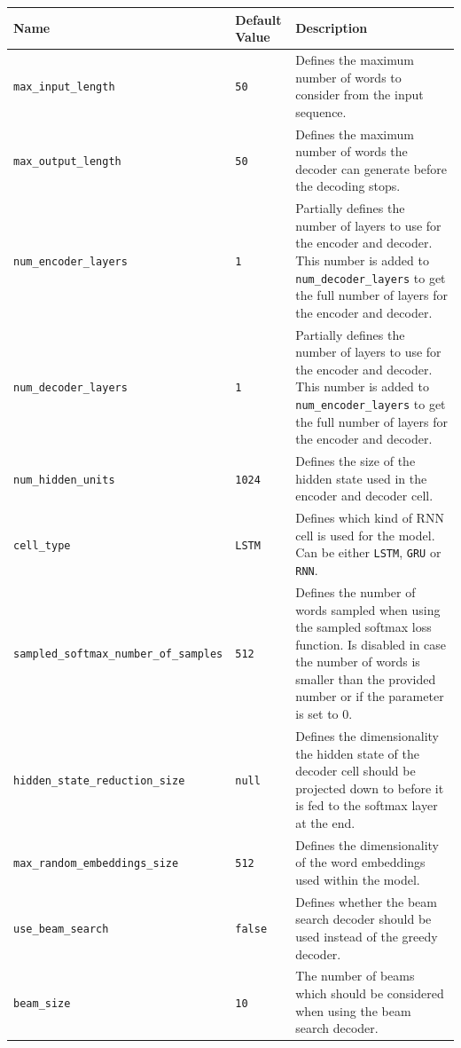 \begin{table}[H]
	\centering
	\begin{adjustbox}{max width=\textwidth, max height=\textheight}
		\begin{tabular}{llp{10cm}}
		\toprule
		Name & Default Value & Description\\ \midrule
		\texttt{max{\_}input\_length} & \texttt{50} & Defines the maximum number of words to consider from the input sequence.\\
		\texttt{max{\_}output\_length} & \texttt{50} & Defines the maximum number of words the decoder can generate before the decoding stops.\\
		\texttt{num{\_}encoder\_layers} & \texttt{1} & Partially defines the number of layers to use for the encoder and decoder. This number is added to \texttt{num{\_}decoder\_layers} to get the full number of layers for the encoder and decoder.\\
		\texttt{num{\_}decoder\_layers} & \texttt{1} & Partially defines the number of layers to use for the encoder and decoder. This number is added to \texttt{num{\_}encoder\_layers} to get the full number of layers for the encoder and decoder.\\
		\texttt{num{\_}hidden\_units} & \texttt{1024} & Defines the size of the hidden state used in the encoder and decoder cell.\\
		\texttt{cell{\_}type} & \texttt{LSTM} & Defines which kind of RNN cell is used for the model. Can be either \texttt{LSTM}, \texttt{GRU} or \texttt{RNN}.\\
		\texttt{sampled{\_}softmax\_number\_of\_samples} & \texttt{512} & Defines the number of words sampled when using the sampled softmax loss function. Is disabled in case the number of words is smaller than the provided number or if the parameter is set to 0.\\
		\texttt{hidden\_state\_reduction\_size} & \texttt{null} & Defines the dimensionality the hidden state of the decoder cell should be projected down to before it is fed to the softmax layer at the end.\\
		\texttt{max\_random\_embeddings\_size} & \texttt{512} & Defines the dimensionality of the word embeddings used within the model.\\
		\texttt{use\_beam\_search} & \texttt{false} & Defines whether the beam search decoder should be used instead of the greedy decoder.\\
		\texttt{beam\_size} & \texttt{10} & The number of beams which should be considered when using the beam search decoder.\\

\end{tabular}
\end{adjustbox}
\end{table}
